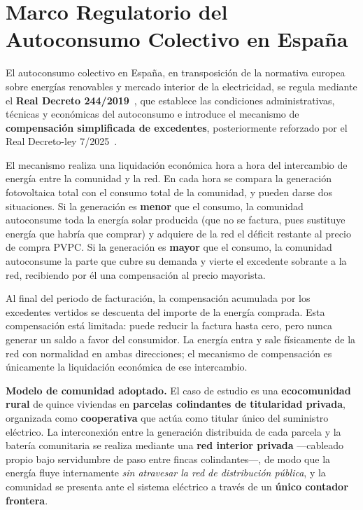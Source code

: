 \documentclass[12pt, a4paper, twoside]{report}
\begin{document}
\section{Marco Regulatorio del Autoconsumo Colectivo en España}
\label{sec:marco_regulatorio}

El autoconsumo colectivo en España, en transposición de la normativa europea
sobre energías renovables y mercado interior de la electricidad, se regula
mediante el \textbf{Real Decreto 244/2019}~\citep{RD244_2019}, que establece las condiciones
administrativas, técnicas y económicas del autoconsumo e introduce el mecanismo
de \textbf{compensación simplificada de excedentes}, posteriormente reforzado
por el Real Decreto-ley 7/2025~\citep{RDL7_2025}.

El mecanismo realiza una liquidación económica hora a hora del intercambio de
energía entre la comunidad y la red. En cada hora se compara la generación
fotovoltaica total con el consumo total de la comunidad, y pueden darse dos
situaciones. Si la generación es \textbf{menor} que el consumo, la comunidad
autoconsume toda la energía solar producida (que no se factura, pues sustituye
energía que habría que comprar) y adquiere de la red el déficit restante al
precio de compra PVPC. Si la generación es \textbf{mayor} que el consumo, la
comunidad autoconsume la parte que cubre su demanda y vierte el excedente
sobrante a la red, recibiendo por él una compensación al precio mayorista.

Al final del periodo de facturación, la compensación acumulada por los
excedentes vertidos se descuenta del importe de la energía comprada. Esta
compensación está limitada: puede reducir la factura hasta cero, pero nunca
generar un saldo a favor del consumidor. La energía entra y sale físicamente de
la red con normalidad en ambas direcciones; el mecanismo de compensación es
únicamente la liquidación económica de ese intercambio.

\textbf{Modelo de comunidad adoptado.} El caso de estudio es una
\textbf{ecocomunidad rural} de quince viviendas en \textbf{parcelas colindantes
de titularidad privada}, organizada como \textbf{cooperativa} que actúa como
titular único del suministro eléctrico. La interconexión entre la generación
distribuida de cada parcela y la batería comunitaria se realiza mediante una
\textbf{red interior privada} —cableado propio bajo servidumbre de paso entre
fincas colindantes—, de modo que la energía fluye internamente \emph{sin
atravesar la red de distribución pública}, y la comunidad se presenta ante el
sistema eléctrico a través de un \textbf{único contador frontera}.
\end{document}
